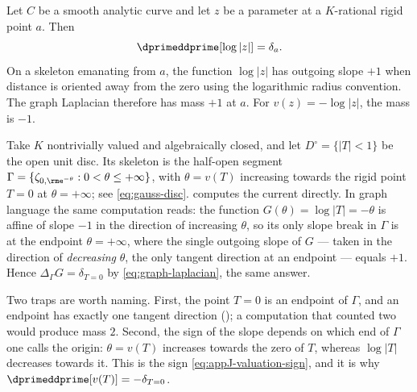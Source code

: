 \begin{example}
\label{ex:ch15-curve-zero}
Let $C$ be a smooth analytic curve and let $z$ be a parameter at a
$K$-rational rigid point $a$.  Then
\[
                    \dprimeddprime[\log|z|]=\delta_a.
\]
On a skeleton emanating from $a$, the function $\log|z|$ has outgoing slope
$+1$ when distance is oriented away from the zero using the logarithmic
radius convention.  The graph Laplacian therefore has mass $+1$ at $a$.
For $v(z)=-\log|z|$, the mass is $-1$.
\end{example}

\begin{example}
\label{ex:ch15-disc-coordinate}
Take $K$ nontrivially valued and algebraically closed, and let
$D^\circ=\{|T|<1\}$ be the open unit disc.  Its skeleton is the half-open
segment $\Gamma=\{\zeta_{0,\rme^{-\theta}}:0<\theta\le+\infty\}$, with
$\theta=v(T)$ increasing towards the rigid point $T=0$ at $\theta=+\infty$;
see \eqref{eq:gauss-disc}.   computes the current
directly.  In graph language the same computation reads: the function
$G(\theta)=\log|T|=-\theta$ is affine of slope $-1$ in the direction of
increasing $\theta$, so its only slope break in $\Gamma$ is at the endpoint
$\theta=+\infty$, where the single outgoing slope of $G$ --- taken in the
direction of \emph{decreasing} $\theta$, the only tangent direction at an
endpoint --- equals $+1$.  Hence $\Delta_\Gamma G=\delta_{T=0}$ by
\eqref{eq:graph-laplacian}, the same answer.

Two traps are worth naming.  First, the point $T=0$ is an endpoint of
$\Gamma$, and an endpoint has exactly one tangent direction
(); a computation that counted two would produce mass
$2$.  Second, the sign of the slope depends on which end of $\Gamma$ one
calls the origin: $\theta=v(T)$ increases towards the zero of $T$, whereas
$\log|T|$ decreases towards it.  This is the sign
\eqref{eq:appJ-valuation-sign}, and it is why
$\dprimeddprime[v(T)]=-\delta_{T=0}$.
\end{example}

